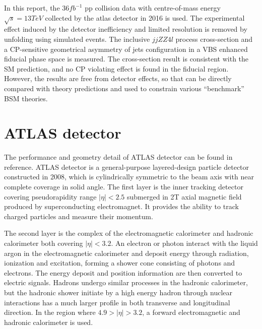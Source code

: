 \documentclass[12pt]{article}
\begin{document}
        \par In this report, the $36 fb^{-1}$ pp collision data with centre-of-mass energy $\sqrt{s} = 13 TeV$ collected by the atlas detector in 2016 is used.
        The experimental effect induced by the detector inefficiency and limited resolution is removed by unfolding\cite{Cowan:2002in} using  
        simulated events. The inclusive $jjZZ4l$ process cross-section and a CP-sensitive geometrical asymmetry of jets configuration in a VBS enhanced 
        fiducial phase space is measured. The cross-section result is consistent with the SM prediction, and no CP violating effect is found in 
        the fiducial region. However, the results are free from detector effects, so that can be directly compared with theory predictions and 
        used to constrain various ``benchmark'' BSM theories.

    \section{ATLAS detector}
        \par The performance and geometry detail of ATLAS detector can be found in reference\cite{Collaboration_2008}. 
        ATLAS detector is a general-purpose layered-design particle detector constructed in 2008, which is cylindrically 
        symmetric to the beam axis with near complete coverage in solid angle. The first layer is the inner tracking 
        detector covering pseudorapidity range $|\eta| < 2.5$ submerged in 2T axial magnetic field produced 
        by superconducting electromagnet. It provides the ability to track charged particles and measure their momentum. 

        The second layer is the complex of the electromagnetic calorimeter and hadronic calorimeter both covering $|\eta| < 3.2$. An electron or photon
        interact with the liquid argon in the electromagnetic calorimeter and deposit energy through radiation, ionization and excitation, forming 
        a shower cone consisting of photons and electrons. The energy deposit and position information are then converted to electric signals.
        Hadrons undergo similar processes in the hadronic calorimeter, but the hadronic shower initiate by a high energy hadron through nuclear interactions has
        a much larger profile in both transverse and longitudinal direction.  
        In the region where $4.9> |\eta| > 3.2$, a forward electromagnetic and hadronic calorimeter is used. 
        
\end{document}
